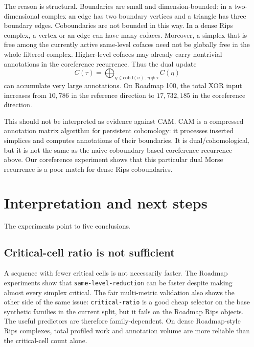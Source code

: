 \documentclass[11pt]{article}
\begin{document}
The reason is structural.  Boundaries are small and dimension-bounded: in a two-dimensional
complex an edge has two boundary vertices and a triangle has three boundary edges.
Coboundaries are not bounded in this way.  In a dense Rips complex, a vertex or an edge can
have many cofaces.  Moreover, a simplex that is free among the currently active same-level
cofaces need not be globally free in the whole filtered complex.  Higher-level cofaces may
already carry nontrivial annotations in the coreference recurrence.  Thus the dual update
\[
  C(\tau)=\bigoplus_{\eta\in \mathrm{cobd}(\sigma),\ \eta\ne\tau} C(\eta)
\]
can accumulate very large annotations.  On Roadmap 100, the total XOR input increases from
$10{,}786$ in the reference direction to $17{,}732{,}185$ in the coreference direction.

This should not be interpreted as evidence against CAM.  CAM is a compressed annotation
matrix algorithm for persistent cohomology: it processes inserted simplices and computes
annotations of their boundaries.  It is dual/cohomological, but it is not the same as the
naive coboundary-based coreference recurrence above.  Our coreference experiment shows that
this particular dual Morse recurrence is a poor match for dense Rips coboundaries.

\section{Interpretation and next steps}

The experiments point to five conclusions.

\subsection{Critical-cell ratio is not sufficient}
A sequence with fewer critical cells is not necessarily faster.  The Roadmap experiments
show that \texttt{same-level-reduction} can be faster despite making almost every simplex
critical.  The fair multi-metric validation also shows the other side of the same issue:
\texttt{critical-ratio} is a good cheap selector on the base synthetic families in the
current split, but it fails on the Roadmap Rips objects.  The useful predictors are
therefore family-dependent.  On dense Roadmap-style Rips complexes, total profiled work
and annotation volume are more reliable than the critical-cell count alone.
\end{document}
